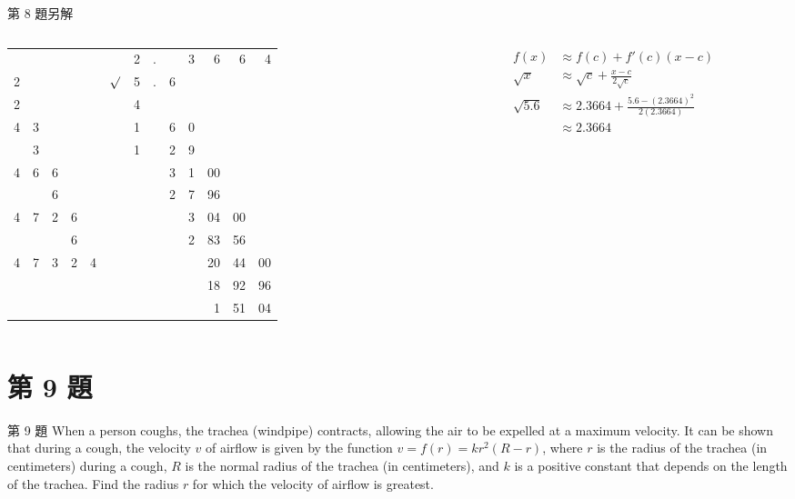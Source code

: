 \documentclass{beamer}
\begin{document}
\begin{CJK}{UTF8}{bsmi}
\begin{frame}{第 8 題另解}
  \begin{solution}
    \begin{columns}
      \begin{column}{0.5\textwidth}
	\begin{center}
	  \begin{tabular}{@{}c@{}c@{}c@{}c@{}c@{} r@{}r@{}c@{}r@{}r@{} r@{}r@{}r@{}}
	   & & & & &       &2&.& &3& 6& 6& 4\\
		     \cline{7-13}
	  2& & & & &$\surd$&5&.&6& \\
	  2& & & & &       &4& & & \\
	  \cline{1-2}\cline{7-13}
	  4&3& & & &       &1& &6&0\\
	   &3& & & &       &1& &2&9\\
	  \cline{1-3}\cline{7-13}
	  4&6&6& & &       & & &3&1&00\\
	   & &6& & &       & & &2&7&96\\
	  \cline{1-4}\cline{9-13}
	  4&7&2&6& &       & & & &3&04&00\\
	   & & &6& &       & & & &2&83&56\\
	  \cline{1-5}\cline{10-13}
	  4&7&3&2&4&       & & & & &20&44&00\\
	   & & & & &       & & & & &18&92&96\\
		     \cline{11-13}
	   & & & & &       & & & & & 1&51&04
	  \end{tabular}
	\end{center}
      \end{column}
      \begin{column}{0.5\textwidth}
	\begin{align*}
	  f(x) &\approx f(c) + f'(c) \left( x-c \right)\\
	  \sqrt x &\approx \sqrt c + \frac{x-c}{2 \sqrt c}\\
	  \sqrt{5.6} &\approx 2.3664 + \frac{5.6 - (2.3664)^2}{2 \left( 2.3664 \right)}\\
	    &\approx 2.3664
	\end{align*}
      \end{column}
    \end{columns}
  \end{solution}
\end{frame}

\section{第 9 題}
\begin{frame}{第 9 題}
  When a person coughs, the trachea (windpipe) contracts, allowing the air to be expelled at a maximum velocity. It can be
  shown that during a cough, the velocity $v$ of airflow is given by the function $v = f(r) = kr^2 \left( R-r \right)$, where
  $r$ is the radius of the trachea (in centimeters) during a cough, $R$ is the normal radius of the trachea (in centimeters),
  and $k$ is a positive constant that depends on the length of the trachea. Find the radius $r$ for which the velocity of
  airflow is greatest.
\end{frame}


\end{CJK}
\end{document}
